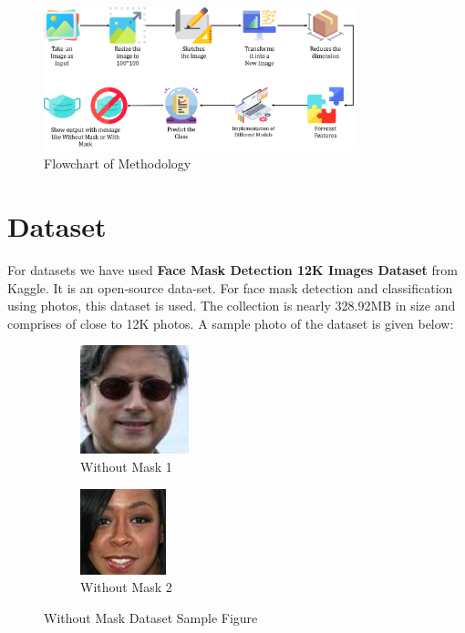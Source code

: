 \documentclass[conference]{IEEEtran}
\begin{document}
\begin{figure}[htbp]
        \centerline{\includegraphics[width=9cm]{SC Flowchart2.png}}
        \caption{Flowchart of Methodology}
        \label{flowchart}
    \end{figure}


\section{Dataset}
For datasets we have used \textbf{Face Mask Detection 12K Images Dataset} from Kaggle.
It is an open-source data-set. For face mask detection and classification using photos, this dataset is used. The collection is nearly 328.92MB in size and comprises of close to 12K photos.
A sample photo of the dataset is given below:
\newpage
\begin{figure}[htbp]
\begin{subfigure}{.5\textwidth}
  \centering
  \includegraphics[width=.3\linewidth]{WithoutMask/635.png}  
  \caption{Without Mask 1}
  \label{fig:sub-first-wom}
\end{subfigure}
\begin{subfigure}{.5\textwidth}
  \centering
  \includegraphics[width=.3\linewidth]{WithoutMask/47.png}  
  \caption{Without Mask 2}
  \label{fig:sub-second-wom}
\end{subfigure}
\caption{Without Mask Dataset Sample Figure}
\label{fig:fig}
\end{figure}
\end{document}
